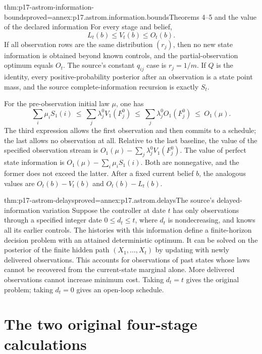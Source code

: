 \begin{hbtheorem}{thm:p17-astrom-information-bounds}{proved=annex:p17.astrom.information.bounds}{Theorems 4--5 and the value of the declared information}
For every stage and belief,
\[
                          L_t(b)\leq V_t(b)\leq O_t(b).
\]
If all observation rows are the same distribution \((r_j)\),
then no new state information is obtained beyond known controls,
and the partial-observation optimum equals \(O_t\).
The source's constant \(q_{ij}\) case is \(r_j=1/m\).
If \(Q\) is the identity, every positive-probability posterior
after an observation is a state point mass, and the source
complete-information recursion is exactly \(S_t\).

For the pre-observation initial law \(\mu\), one has
\[
 \sum_i\mu_i S_1(i)
 \ \leq\ \sum_j\lambda_j^0V_1(F_j^0)
 \ \leq\ \sum_j\lambda_j^0O_1(F_j^0)
 \ \leq\ O_1(\mu).
\]
The third expression allows the first observation and then
commits to a schedule; the last allows no observation at all.
Relative to the last baseline, the value of the specified
observation stream is
\(O_1(\mu)-\sum_j\lambda_j^0V_1(F_j^0)\).
The value of perfect state information is
\(O_1(\mu)-\sum_i\mu_iS_1(i)\).
Both are nonnegative, and the former does not exceed the latter.
After a fixed current belief \(b\), the analogous values are
\(O_t(b)-V_t(b)\) and \(O_t(b)-L_t(b)\).
\end{hbtheorem}

\begin{hbtheorem}{thm:p17-astrom-delays}{proved=annex:p17.astrom.delays}{The source's delayed-information variation}
Suppose the controller at date \(t\) has only observations
through a specified integer date \(0\leq d_t\leq t\), where \(d_t\) is
nondecreasing, and knows all its earlier controls.
The histories with this information define a finite-horizon
decision problem with an attained deterministic optimum.
It can be solved on the posterior of the finite hidden path
\((X_1,\ldots,X_t)\) by updating with newly delivered observations.
This accounts for observations of past states whose laws cannot
be recovered from the current-state marginal alone.
More delivered observations cannot increase minimum cost.
Taking \(d_t=t\) gives the original problem; taking \(d_t=0\)
gives an open-loop schedule.
\end{hbtheorem}

\section{The two original four-stage calculations}

